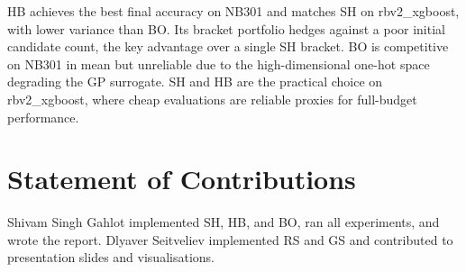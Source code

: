 \documentclass{AIM_report}
\begin{document}
HB achieves the best final accuracy on NB301 and matches SH on
rbv2\_xgboost, with lower variance than BO.
Its bracket portfolio hedges against a poor initial candidate count,
the key advantage over a single SH bracket.
BO is competitive on NB301 in mean but unreliable due to the
high-dimensional one-hot space degrading the GP surrogate.
SH and HB are the practical choice on rbv2\_xgboost, where cheap
evaluations are reliable proxies for full-budget performance.

\section*{Statement of Contributions}

Shivam Singh Gahlot implemented SH, HB, and BO, ran all experiments, and
wrote the report.
Dlyaver Seitveliev implemented RS and GS and contributed to presentation
slides and visualisations.




\newpage
\pagestyle{empty}

\end{document}
